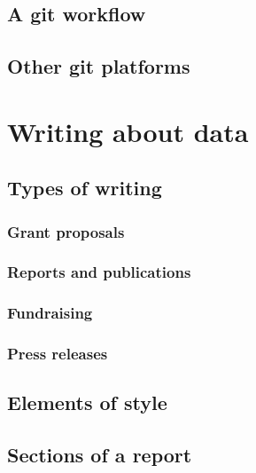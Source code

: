 \documentclass[
]{book}
\begin{document}
\hypertarget{a-git-workflow}{%
\chapter{A git workflow}\label{a-git-workflow}}

\hypertarget{other-git-platforms}{%
\chapter{Other git platforms}\label{other-git-platforms}}

\hypertarget{part-writing-about-data}{%
\part{Writing about data}\label{part-writing-about-data}}

\hypertarget{types-of-writing}{%
\chapter{Types of writing}\label{types-of-writing}}

\hypertarget{grant-proposals}{%
\section{Grant proposals}\label{grant-proposals}}

\hypertarget{reports-and-publications}{%
\section{Reports and publications}\label{reports-and-publications}}

\hypertarget{fundraising}{%
\section{Fundraising}\label{fundraising}}

\hypertarget{press-releases}{%
\section{Press releases}\label{press-releases}}

\hypertarget{elements-of-style}{%
\chapter{Elements of style}\label{elements-of-style}}

\hypertarget{sections-of-a-report}{%
\chapter{Sections of a report}\label{sections-of-a-report}}
\end{document}

